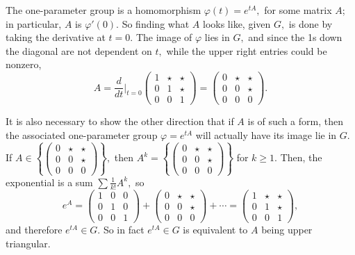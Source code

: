 The one-parameter group is a homomorphism $\varphi(t) = e^{tA},$ for some matrix $A$; in particular, $A$ is $\varphi'(0).$ So finding what $A$ looks like, given $G,$ is done by taking the derivative at $t = 0.$ The image of $\varphi$ lies in $G,$ and since the 1s down the diagonal are not dependent on $t,$ while the upper right entries could be nonzero, 
\[
A = \frac{d}{dt}\Big|_{t = 0} \begin{pmatrix} 1 & \star & \star \\ 0 & 1 & \star \\ 0 & 0 & 1 \end{pmatrix} = \begin{pmatrix} 0 & \star & \star \\ 0 & 0 & \star \\ 0 & 0 & 0 \end{pmatrix}.
\]

It is also necessary to show the other direction that if $A$ is of such a form, then the associated one-parameter group $\varphi = e^{tA}$ will actually have its image lie in $G.$ If $A \in \left\{\begin{pmatrix} 0 & \star & \star \\ 0 & 0 & \star \\ 0 & 0 & 0 \end{pmatrix}\right\},$ then $A^k = \left\{\begin{pmatrix} 0 & \star & \star \\ 0 & 0 & \star \\ 0 & 0 & 0 \end{pmatrix}\right\}$ for $k \geq 1.$ Then, the exponential is a sum $\sum \frac{1}{k!} A^k,$ so
\[
e^{A} = \begin{pmatrix} 1 & 0 & 0 \\ 0 & 1 & 0 \\ 0 & 0 & 1 \end{pmatrix} + \begin{pmatrix} 0 & \star & \star \\ 0 & 0 & \star \\ 0 & 0 & 0 \end{pmatrix} + \cdots = \begin{pmatrix} 1 & \star & \star \\ 0 & 1 & \star \\ 0 & 0 & 1 \end{pmatrix},
\]
and therefore $e^{tA} \in G.$ So in fact $e^{tA} \in G$ is equivalent to $A$ being upper triangular. 


